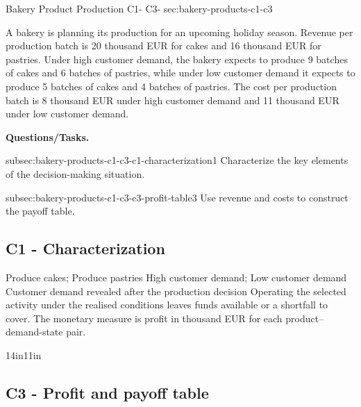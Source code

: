 	\sectionScored
	{Bakery Product Production}
	{C1- \hspace{2mm} C3-}
	{sec:bakery-products-c1-c3}
	{
		A bakery is planning its production for an upcoming holiday season. Revenue per production batch is 20 thousand EUR for cakes and
		16 thousand EUR for pastries. Under high customer demand, the
		bakery expects to produce 9 batches of cakes and 6 batches of pastries, while
		under low customer demand it expects to produce 5 batches of
		cakes and 4 batches of pastries. The cost per production batch is 8 thousand
		EUR under high customer demand and 11 thousand EUR under low
		customer demand.
		
			\textbf{Questions/Tasks.}
		\begin{enumerate}
			\CriterionTask
			{subsec:bakery-products-c1-c3-c1-characterization}{1}
			{Characterize the key elements of the decision-making situation. }
			
			\CriterionTask
			{subsec:bakery-products-c1-c3-c3-profit-table}{3}
			{Use revenue and costs to construct the payoff table. }
		\end{enumerate}
		
		\label{subsec:bakery-products-c1-c3-c1-characterization}
		\subsection*{C1 - Characterization }
		
		\DecisionElementsTable
{Produce cakes; Produce pastries}
{High customer demand; Low customer demand}
{Customer demand revealed after the production decision}
{Operating the selected activity under the realised conditions leaves funds available or a shortfall to cover. The monetary measure is profit in thousand EUR for each product--demand-state pair.}

		
		\begin{CalculationLandscape}{14in}{11in}
		\label{subsec:bakery-products-c1-c3-c3-profit-table}
		\subsection*{C3 - Profit and payoff table }
		
		



\end{CalculationLandscape}}
